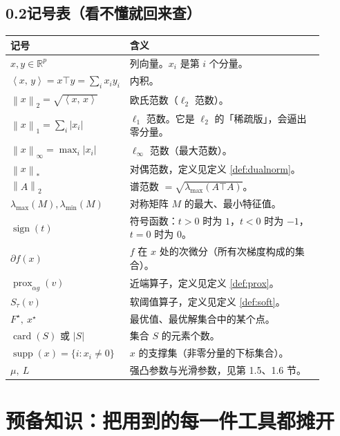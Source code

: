 \documentclass[11pt,a4paper,UTF8]{ctexart}
\theoremstyle{plain}
\theoremstyle{definition}
\theoremstyle{remark}
\newcommand{\R}{\mathbb{R}}
\newcommand{\norm}[1]{\left\lVert #1 \right\rVert}
\newcommand{\abs}[1]{\left\lvert #1 \right\rvert}
\newcommand{\inner}[2]{\left\langle #1,\, #2 \right\rangle}
\newcommand{\prox}{\operatorname{prox}}
\newcommand{\supp}{\operatorname{supp}}
\DeclareMathOperator{\sign}{sign}
\DeclareMathOperator{\card}{card}
\begin{document}
\subsection*{0.2\quad 记号表（看不懂就回来查）}

\begin{center}
\small
\begin{tabular}{@{}p{0.19\linewidth}p{0.71\linewidth}@{}}
\toprule
记号 & 含义 \\
\midrule

$x,y\in\R^p$ & 列向量。$x_i$ 是第 $i$ 个分量。\\
$\inner{x}{y}=x\top y=\sum_i x_iy_i$ & 内积。\\
$\norm{x}_2=\sqrt{\inner{x}{x}}$ & 欧氏范数（$\ell_2$ 范数）。\\
$\norm{x}_1=\sum_i\abs{x_i}$ & $\ell_1$ 范数。它是 $\ell_2$ 的「稀疏版」，会逼出零分量。\\
$\norm{x}_\infty=\max_i\abs{x_i}$ & $\ell_\infty$ 范数（最大范数）。\\
$\norm{x}_{\ast}$ & 对偶范数，定义见定义 \ref{def:dualnorm}。\\
$\norm{A}_2$ & 谱范数 $=\sqrt{\lambda_{\max}(A\top A)}$。\\
$\lambda_{\max}(M),\lambda_{\min}(M)$ & 对称矩阵 $M$ 的最大、最小特征值。\\
$\sign(t)$ & 符号函数：$t>0$ 时为 $1$，$t<0$ 时为 $-1$，$t=0$ 时为 $0$。\\
$\partial f(x)$ & $f$ 在 $x$ 处的次微分（所有次梯度构成的集合）。\\
$\prox_{\alpha g}(v)$ & 近端算子，定义见定义 \ref{def:prox}。\\
$S_\tau(v)$ & 软阈值算子，定义见定义 \ref{def:soft}。\\
$F^\star,\ x^\star$ & 最优值、最优解集合中的某个点。\\
$\card(S)$ 或 $\abs{S}$ & 集合 $S$ 的元素个数。\\
$\supp(x)=\{i:x_i\neq 0\}$ & $x$ 的支撑集（非零分量的下标集合）。\\
$\mu,\ L$ & 强凸参数与光滑参数，见第 1.5、1.6 节。\\
\bottomrule
\end{tabular}
\end{center}

\section{预备知识：把用到的每一件工具都摊开}
\end{document}
